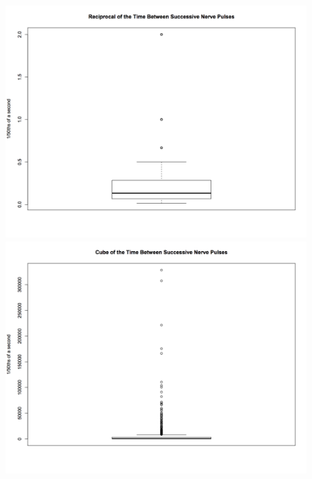 \documentclass[a4paper]{article}
\begin{document}
\begin{enumerate}
\begin{enumerate}
		\begin{figure}[!htb]
			\centering
		    \begin{minipage}{0.5\textwidth}
		        \centering
		        \includegraphics[width=\linewidth, height=0.27\textheight]{recipdata.png}
		    \end{minipage}%
		    \centering
		    \begin{minipage}{0.5\textwidth}
		        \centering
		        \includegraphics[width=\linewidth, height=0.27\textheight]{cubedata.png}
		    \end{minipage}
		\end{figure}

	\end{enumerate}

\end{enumerate}
\end{document}
